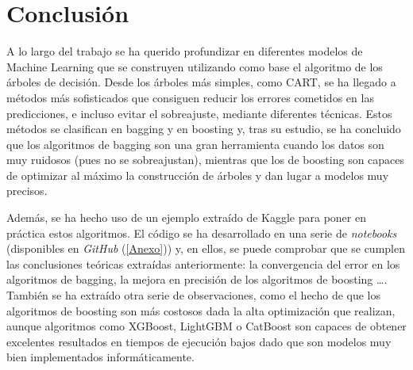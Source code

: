 \documentclass[12pt,twoside]{article}
\begin{document}
\newpage
\section{Conclusión}
A lo largo del trabajo se ha querido profundizar en diferentes modelos de Machine Learning que se construyen utilizando como base el algoritmo de los árboles de decisión. Desde los árboles más simples, como CART, se ha llegado a métodos más sofisticados que consiguen reducir los errores cometidos en las predicciones, e incluso evitar el sobreajuste, mediante diferentes técnicas. Estos métodos se clasifican en bagging y en boosting y, tras su estudio, se ha concluido que los algoritmos de bagging son una gran herramienta cuando los datos son muy ruidosos (pues no se sobreajustan), mientras que los de boosting son capaces de optimizar al máximo la construcción de árboles y dan lugar a modelos muy precisos.

Además, se ha hecho uso de un ejemplo extraído de Kaggle para poner en práctica estos algoritmos. El código se ha desarrollado en una serie de \textit{notebooks} (disponibles en \textit{GitHub} (\ref{Anexo})) y, en ellos, se puede comprobar que se cumplen las conclusiones teóricas extraídas anteriormente: la convergencia del error en los algoritmos de bagging, la mejora en precisión de los algoritmos de boosting \dots. También se ha extraído otra serie de observaciones, como el hecho de que los algoritmos de boosting son más costosos dada la alta optimización que realizan, aunque algoritmos como XGBoost, LightGBM o CatBoost son capaces de obtener excelentes resultados en tiempos de ejecución bajos dado que son modelos muy bien implementados informáticamente. 
\end{document}
